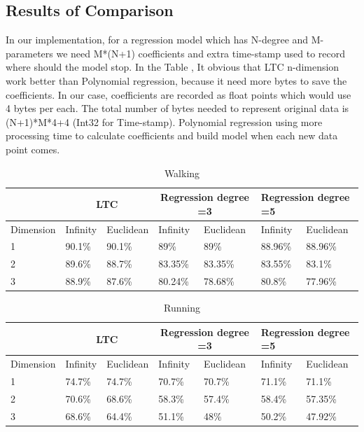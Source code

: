 \subsection{Results of Comparison}
In our implementation, for a regression model which has N-degree and
M-parameters we need M*(N+1) coefficients and extra time-stamp used to record
where should the model stop. In the Table , It obvious that LTC n-dimension work
better than Polynomial regression, because it need more bytes to save the
coefficients. In our case, coefficients are recorded as float points which would
use 4 bytes per each. The total number of bytes needed to represent original
data is (N+1)*M*4+4 (Int32 for Time-stamp). Polynomial regression using more
processing time to calculate coefficients and build model when each new data
point comes.
\begin{table}[]
\begin{tabular}{|l|l|l|l|l|l|l|l|}
\hline
           & \multicolumn{2}{c|}{LTC} & \multicolumn{2}{c|}{Regression degree =3} & \multicolumn{3}{l|}{Regression degree =5}\\ \hline
Dimension & Infinity   & Euclidean   & Infinity    & Euclidean     & Infinity      & \multicolumn{2}{l|}{Euclidean} \\ \hline
1          & 90.1\%     & 90.1\%      & 89\%        & 89\%          & 88.96\%       & \multicolumn{2}{l|}{88.96\%}   \\ \hline
2          & 89.6\%     & 88.7\%      & 83.35\%     & 83.35\%       & 83.55\%       & \multicolumn{2}{l|}{83.1\%}    \\ \hline
3          & 88.9\%     & 87.6\%      & 80.24\%     & 78.68\%       & 80.8\%        & \multicolumn{2}{l|}{77.96\%}   \\ \hline
\end{tabular}
\caption{Walking}
\end{table}


\begin{table}[]
\begin{tabular}{|l|l|l|l|l|l|l|l|}
\hline
           & \multicolumn{2}{c|}{LTC} & \multicolumn{2}{c|}{Regression degree =3} & \multicolumn{3}{l|}{Regression degree =5}          \\ \hline
Dimension & Infinity   & Euclidean   & Infinity            & Euclidean           & Infinity& \multicolumn{2}{l|}{Euclidean} \\ \hline
1          & 74.7\%     & 74.7\%      & 70.7\%      & 70.7\%        & 71.1\%        & \multicolumn{2}{l|}{71.1\%}    \\ \hline
2          & 70.6\%     & 68.6\%      & 58.3\%      & 57.4\%        & 58.4\%        & \multicolumn{2}{l|}{57.35\%}   \\ \hline
3          & 68.6\%     & 64.4\%      & 51.1\%      & 48\%          & 50.2\%        & \multicolumn{2}{l|}{47.92\%}   \\ \hline
\end{tabular}
\caption{Running}
\end{table}
